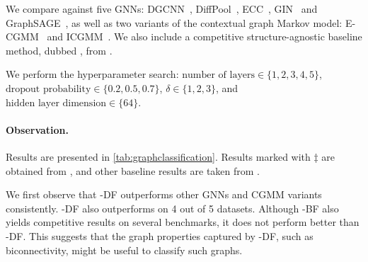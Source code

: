 We compare \model{} against five GNNs: DGCNN~\citep{zhang2018end}, DiffPool~\citep{Ying18diffpool}, ECC~\citep{Simonovsky17ECC}, GIN~\citep{xu2018powerful} and GraphSAGE~\cite{hamilton2017inductive}, as well as two variants of the contextual graph Markov model: E-CGMM~\citep{Atzeni21E-CGMM} and ICGMM~\citep{Castellana22ICGMM}. We also include a competitive structure-agnostic baseline method, dubbed \baseline{}, from \citet{errica2019fair}.

We perform the hyperparameter search:
$\text{number of layers}\in \{1, 2,3,4,5\}$,
$\text{dropout probability} \in \{0.2, 0.5, 0.7\}$,
$\delta\in\{1,2,3\}$, and
$\text{hidden layer dimension}\in\{64\}$.


\paragraph{Observation.} 
Results are presented in \cref{tab:graphclassification}. Results marked with $\ddagger$ are obtained from \citet{Castellana22ICGMM}, and other baseline results are taken from \citet{errica2019fair}.

We first observe that \model{}-DF outperforms other GNNs and CGMM variants consistently. \model{}-DF also outperforms \baseline{} on 4 out of 5 datasets. Although \model{}-BF also yields competitive results on several benchmarks, it does not perform better than \model{}-DF. This suggests that the graph properties captured by \model{}-DF, such as biconnectivity, might be useful to classify such graphs. 

